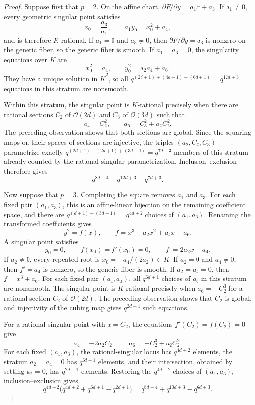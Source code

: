 \documentclass[10pt,a4paper]{amsart}
\begin{document}
\begin{proof}
Suppose first that $p=2$.  On the affine chart, $\partial F/\partial y=a_1x+a_3$.  If $a_1\neq0$, every geometric singular point satisfies
\[
x_0=\frac{a_3}{a_1},
\qquad
a_1y_0=x_0^2+a_4,
\]
and is therefore $K$-rational.  If $a_1=0$ and $a_3\neq0$, then $\partial F/\partial y=a_3$ is nonzero on the generic fiber, so the generic fiber is smooth.  If $a_1=a_3=0$, the singularity equations over $\overline K$ are
\[
x_0^2=a_4,
\qquad
y_0^2=a_2a_4+a_6.
\]
They have a unique solution in $\overline K^2$, so all $q^{(2d+1)+(4d+1)+(6d+1)}=q^{12d+3}$ equations in this stratum are nonsmooth.

Within this stratum, the singular point is $K$-rational precisely when there are rational sections $C_2$ of $\mathcal O(2d)$ and $C_3$ of $\mathcal O(3d)$ such that
\[
a_4=C_2^2,
\qquad
a_6=C_3^2+a_2C_2^2.
\]
The preceding observation shows that both sections are global.  Since the squaring maps on their spaces of sections are injective, the triples $(a_2,C_2,C_3)$ parametrize exactly $q^{(2d+1)+(2d+1)+(3d+1)}=q^{7d+3}$ members of this stratum already counted by the rational-singular parametrization.  Inclusion--exclusion therefore gives
\[
q^{8d+4}+q^{12d+3}-q^{7d+3}.
\]

Now suppose that $p=3$.  Completing the square removes $a_1$ and $a_3$. For each fixed pair $(a_1,a_3)$, this is an affine-linear bijection on the remaining coefficient space, and there are $q^{(d+1)+(3d+1)}=q^{4d+2}$ choices of $(a_1,a_3)$.  Renaming the transformed coefficients gives
\[
y^2=f(x),
\qquad
f=x^3+a_2x^2+a_4x+a_6.
\]
A singular point satisfies
\[
y_0=0,
\qquad
f(x_0)=f'(x_0)=0,
\qquad
f'=2a_2x+a_4.
\]
If $a_2\neq0$, every repeated root is $x_0=-a_4/(2a_2)\in K$.  If $a_2=0$ and $a_4\neq0$, then $f'=a_4$ is nonzero, so the generic fiber is smooth.  If $a_2=a_4=0$, then $f=x^3+a_6$.  For each fixed pair $(a_1,a_3)$, all $q^{6d+1}$ choices of $a_6$ in this stratum are nonsmooth.  The singular point is $K$-rational precisely when $a_6=-C_2^3$ for a rational section $C_2$ of $\mathcal O(2d)$.  The preceding observation shows that $C_2$ is global, and injectivity of the cubing map gives $q^{2d+1}$ such equations.

For a rational singular point with $x=C_2$, the equations $f'(C_2)=f(C_2)=0$ give
\[
a_4=-2a_2C_2,
\qquad
a_6=-C_2^3+a_2C_2^2.
\]
For each fixed $(a_1,a_3)$, the rational-singular locus has $q^{4d+2}$ elements, the stratum $a_2=a_4=0$ has $q^{6d+1}$ elements, and their intersection, obtained by setting $a_2=0$, has $q^{2d+1}$ elements. Restoring the $q^{4d+2}$ choices of $(a_1,a_3)$, inclusion--exclusion gives
\[
q^{4d+2}
\bigl(q^{4d+2}+q^{6d+1}-q^{2d+1}\bigr)
=q^{8d+4}+q^{10d+3}-q^{6d+3}.
\]


\end{proof}
\end{document}
